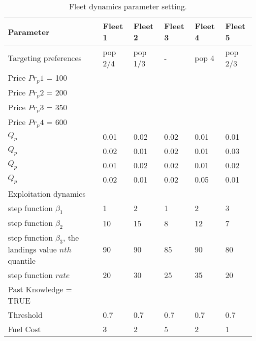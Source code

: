 \begin{table}[!ht]
\caption{Fleet dynamics parameter setting.}
\begin{tabular}{ p{4cm } p{1.2cm} p{1.2cm} p{1.2cm} p{1.2cm} p{1.2cm}}
	\hline
	Parameter & Fleet 1 & Fleet 2 & Fleet 3 & Fleet 4 & Fleet 5 \\
	\hline
	Targeting preferences & pop 2/4 & pop 1/3 & - & pop 4 & pop
	2/3 \\
	\hline
	Price $Pr_{p}1$ = 100 & & & & & \\
	Price $Pr_{p}2$ = 200 & & & & & \\
	Price $Pr_{p}3$ = 350 & & & & & \\
	Price $Pr_{p}4$ = 600 & & & & & \\
	$Q_{p}$ & 0.01 & 0.02 & 0.02 & 0.01 & 0.01 \\
	$Q_{p}$ & 0.02 & 0.01 & 0.02 & 0.01 & 0.03\\
	$Q_{p}$ & 0.01 & 0.02 & 0.02 & 0.01 & 0.02 \\
	$Q_{p}$ & 0.02 & 0.01 & 0.02 & 0.05 & 0.01 \\
	\hline
	Exploitation dynamics &&&& \\
	\hline
	step function $\beta_1$ & 1 & 2 & 1 & 2 & 3 \\
	step function $\beta_2$ & 10 & 15 & 8 & 12 & 7 \\
	step function $\beta_3$, the landings value $nth$ quantile &
	90 & 90 & 85 & 90 & 80 \\
	step function $rate$ & 20 & 30 & 25 & 35 & 20 \\
	Past Knowledge = TRUE & & & & & \\
	Threshold & 0.7 & 0.7 & 0.7 & 0.7 & 0.7 \\
	Fuel Cost & 3 & 2 & 5 & 2 & 1 \\
	\hline
\end{tabular}
\label{tab:2}
\end{table}

